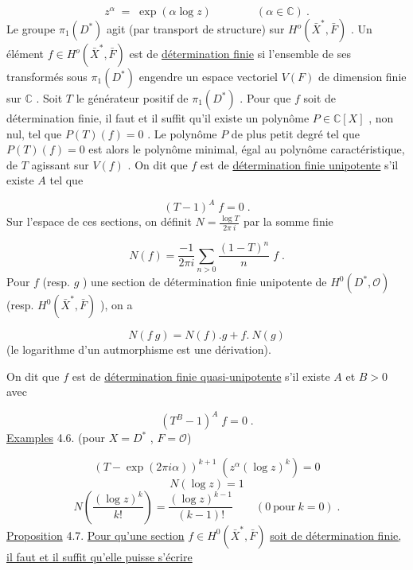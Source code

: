 \begin{equation*}
z^\alpha \;=\; \exp(\alpha \log z) \qquad\qquad (\alpha \in \mathbb{C}) \ .
\end{equation*}
Le groupe $\pi_1(D^*)$ agit (par transport de structure) sur $H^o(\bar{X}^*, \bar{F})$ . Un élément $f \in H^o(\bar{X}^*, \bar{F})$ est de \underline{détermination finie} si l'ensemble de ses transformés sous $\pi_1(D^*)$ engendre un espace vectoriel $V(F)$ de dimension finie sur $\mathbb{C}$ . Soit $T$ le générateur positif de $\pi_1(D^*)$ . Pour que $f$ soit de détermination finie,
il faut et il suffit qu'il existe un polynôme $P \in \mathbb{C}[X]$ , non nul, tel que $P(T)(f) = 0$ . Le polynôme $P$ de plus petit degré tel que $P(T)(f) = 0$ est alors le polynôme minimal, égal au polynôme caractéristique, de $T$ agissant sur $V(f)$ . On dit que $f$ est de \underline{détermination finie unipotente} s'il existe $A$ tel que

\begin{equation*}
(T-1)^A \; f = 0 \; .
\end{equation*}
Sur l'espace de ces sections, on définit $N = \frac{\log T}{2\pi\ i}$ par la somme finie

\begin{equation*}
N(f) = \frac{-1}{2\pi i} \sum_{n > 0} \frac{(1-T)^n}{n} \; f \; .
\end{equation*}
Pour $f$ (resp. $g$ ) une section de détermination finie unipotente de $H^0(D^*, \mathcal{O})$ (resp. $H^0(\bar{X}^*, \bar{F})$ ), on a

\begin{equation*}
N(f\ g) = N(f).g + f.\ N(g)
\end{equation*}
(le logarithme d'un autmorphisme est une dérivation).

On dit que $f$ est de \underline{détermination finie quasi-unipotente} s'il existe $A$ et $B > 0$ avec

\begin{equation*}
(T^B - 1)^A \; f = 0 \; .
\end{equation*}
\underline{Examples} 4.6. (pour $X = D^*$ , $F = \mathcal{O}$)

\begin{equation*}
(T - \exp(2\pi i\alpha))^{k+1} \; (z^{\alpha}(\log z)^k) = 0
\end{equation*}
\begin{equation*}
N(\log z) = 1
\end{equation*}
\begin{equation*}
N\left(\frac{(\log z)^k}{k!}\right) = \frac{(\log z)^{k-1}}{(k-1)!} \qquad (0 \ \mbox{pour} \ k = 0) \; .
\end{equation*}
\underline{Proposition} 4.7. \underline{Pour qu'une section} $f \in H^0(\bar{X}^*, \bar{F})$ \underline{soit de détermination finie, il faut et il suffit qu'elle puisse s'écrire}

